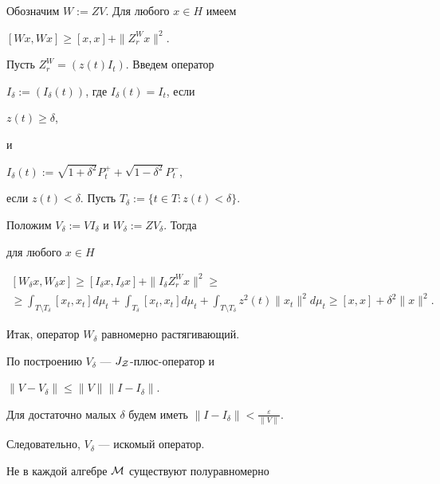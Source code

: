 \begin{pf}


Обозначим $W:=ZV$. Для любого $x\in H$ имеем


$[Wx,Wx]\geq [x,x]+\| Z_{r}^{W}x\|^{2}$.


Пусть $Z_{r}^{W}=(z(t)I_{t})$. Введем оператор


$I_{\delta}:= (I_{\delta}(t))$, где $I_{\delta}(t)=I_{t}$, если


$z(t)\geq \delta$,


и


$I_{\delta}(t):=\sqrt{1+\delta^{2}}P_{t}^{+}+\sqrt{1-\delta^{2}}P^{-}_{t}$,


если $z(t)<\delta$. Пусть $T_{\delta}:=\{t\in T: z(t)<\delta\}$.


Положим $V_{\delta}:=VI_{\delta}$ и $W_{\delta}:=ZV_{\delta}$. Тогда


для любого $x\in H$


\begin{multline*}


[W_{\delta}x,W_{\delta}x]\geq [I_{\delta}x,I_{\delta}x]+


\| I_{\delta}Z_{r}^{W}x\|^{2}\geq \\ \ge


\int_{T\setminus T_{\delta}}[x_{t},x_{t}]d\mu_{t} +\int_{T_{\delta}}


[x_{t},x_{t}]d\mu_{t}+\int_{T\setminus T_{\delta}}z^{2}(t)\| x_{t}\|^{2}


d\mu_{t}\geq [x,x]+\delta^{2}\| x\|^{2}.


\end{multline*}





Итак, оператор $W_{\delta}$ равномерно растягивающий.


По построению $V_{\delta}$ --- $J_{\cal Z}$-плюс-оператор и


$\| V-V_{\delta}\| \leq\| V\|\| I-I_{\delta}\|$.


Для достаточно малых $\delta$ будем иметь $\| I-I_{\delta}\|


<\frac {\varepsilon} {\| V\|}$.


Следовательно, $V_{\delta}$ --- искомый оператор.


\end{pf}





Не в каждой алгебре ${\cal M}$ существуют полуравномерно


